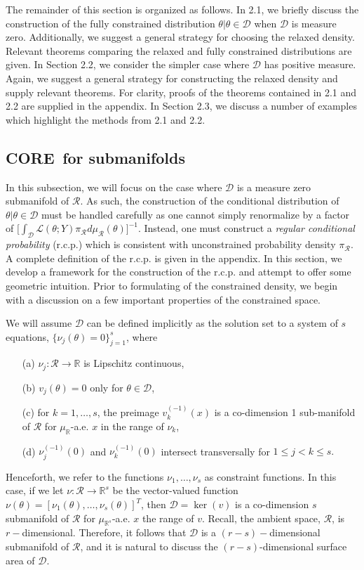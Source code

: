 \documentclass[12 point]{article}
\newcommand{\core}{\textbf{CORE}}
\begin{document}
The remainder of this section is organized as follows.  In 2.1, we briefly discuss the construction of the fully constrained distribution $\theta|\theta \in \mathcal{D}$ when $\mathcal{D}$ is measure zero.  Additionally, we suggest a general strategy for choosing the relaxed density.  Relevant theorems comparing the relaxed and fully constrained distributions are given. In Section 2.2, we consider the simpler case where $\mathcal{D}$ has positive measure.  Again, we suggest a general strategy for constructing the relaxed density and supply relevant theorems.  For clarity, proofs of the theorems contained in 2.1 and 2.2 are supplied in the appendix. In Section 2.3, we discuss a number of examples which highlight the methods from 2.1 and 2.2.


\subsection{\core\, for submanifolds}

In this subsection, we will focus on the case where $\mathcal{D}$ is a measure zero submanifold of $\mathcal{R}$. As such, the construction of the conditional distribution of $\theta|\theta \in \mathcal{D}$ must be handled carefully as one cannot simply renormalize by a factor of $\big[\int_\mathcal{D}\mathcal{L}(\theta;Y)\pi_\mathcal{R}d\mu_\mathcal{R}(\theta)\big]^{-1}.$  Instead, one must construct a \emph{regular conditional probability} (r.c.p.) which is consistent with unconstrained probability density $\pi_\mathcal{R}.$  A complete definition of the r.c.p. is given in the appendix. In this section, we develop a framework for the construction of the r.c.p. and attempt to offer some geometric intuition.  Prior to formulating of the constrained density, we begin with a discussion on a few important properties of the constrained space.

We will assume $\mathcal{D}$ can be defined implicitly as the solution set to a system of $s$ equations,  $\{\nu_j(\theta)=0\}_{j=1}^s$, where 
\begin{itemize}
\item[(a)] $\nu_j:\mathcal{R}\to\mathbb{R}$ is Lipschitz continuous,
\item[(b)] $v_j(\theta)=0$ only for $\theta\in\mathcal{D}$,
\item[(c)] for $k=1,\dots, s$, the preimage $v_k^{(-1)}(x)$ is a co-dimension 1 sub-manifold of $\mathcal{R}$ for $\mu_\mathbb{R}$-a.e. $x$ in the range of $\nu_k$,
\item[(d)] $\nu_j^{(-1)}(0)$ and $\nu_k^{(-1)}(0)$ intersect transversally for $1\le j<k\le s.$
\end{itemize}
Henceforth, we refer to the functions $\nu_1,\dots,\nu_s$ as constraint functions. In this case, if we let $\nu:\mathcal{R}\to \mathbb{R}^s$ be the vector-valued function $\nu(\theta) = [\nu_1(\theta),\dots,\nu_s(\theta)]^T$, then $\mathcal{D} = \ker(v)$ is a co-dimension $s$ submanifold of $\mathcal{R}$ for $\mu_{\mathbb{R}^s}$-a.e. $x$ the range of $v.$  Recall, the ambient space, $\mathcal{R}$, is $r-$dimensional. Therefore, it follows that $\mathcal{D}$ is a $(r-s)-$dimensional submanifold of $\mathcal{R}$, and it is natural to discuss the $(r-s)$-dimensional surface area of $\mathcal{D}.$
\end{document}
